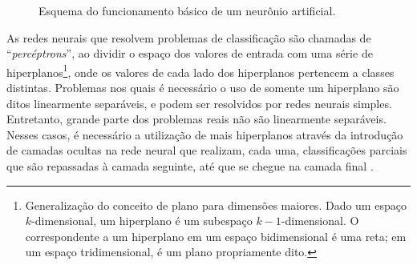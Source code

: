 \documentclass[
	12pt,				%
	openright,			%
	twoside,			%
	a4paper,			%
	tcc,			%
	]{ABNT-DC-UEL}
\begin{document}
\begin{figure}[hbt]
    \centering
    \caption{Esquema do funcionamento básico de um neurônio artificial.}
    \label{fig:neuronio}
\end{figure}

As redes neurais que resolvem problemas de classificação são chamadas de ``\textit{percéptrons}'', ao dividir o espaço dos valores de entrada com uma série de hiperplanos\footnote{Generalização do conceito de plano para dimensões maiores. Dado um espaço $k$-dimensional, um hiperplano é um subespaço $k-1$-dimensional. O correspondente a um hiperplano em um espaço bidimensional é uma reta; em um espaço tridimensional, é um plano propriamente dito.}, onde os valores de cada lado dos hiperplanos pertencem a classes distintas. Problemas nos quais é necessário o uso de somente um hiperplano são ditos linearmente separáveis, e podem ser resolvidos por redes neurais simples. Entretanto, grande parte dos problemas reais não são linearmente separáveis. Nesses casos, é necessário a utilização de mais hiperplanos através da introdução de camadas ocultas na rede neural que realizam, cada uma, classificações parciais que são repassadas à camada seguinte, até que se chegue na camada final \cite{krogh:08, alpaydin:20}.
\end{document}
